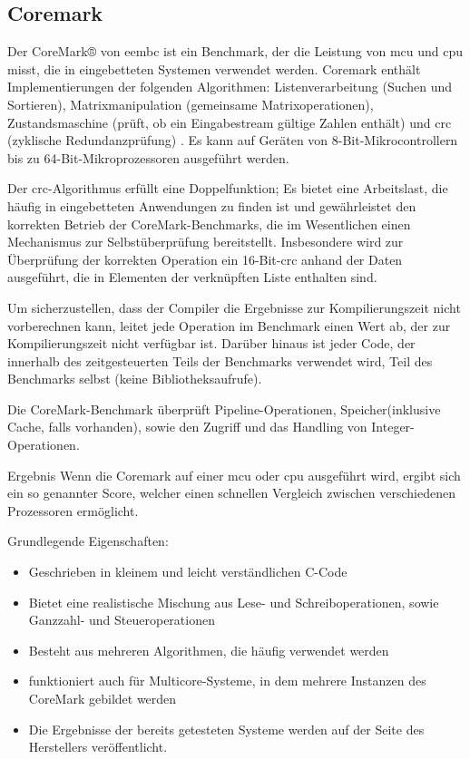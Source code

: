   \subsection{Coremark}\label{kap:coremark}
  Der CoreMark® von \ac{eembc} ist ein Benchmark, der die Leistung von \ac{mcu} und \ac{cpu} misst, die in eingebetteten Systemen verwendet werden.
   Coremark enthält Implementierungen der folgenden Algorithmen: Listenverarbeitung (Suchen und Sortieren),
    Matrixmanipulation (gemeinsame Matrixoperationen), Zustandsmaschine (prüft, ob ein Eingabestream gültige Zahlen enthält) und \ac{crc} (zyklische Redundanzprüfung) .
    Es kann auf Geräten von 8-Bit-Mikrocontrollern bis zu 64-Bit-Mikroprozessoren ausgeführt werden.

  Der \ac{crc}-Algorithmus erfüllt eine Doppelfunktion; Es bietet eine Arbeitslast, die häufig in eingebetteten Anwendungen zu finden ist
  und gewährleistet den korrekten Betrieb der CoreMark-Benchmarks, die im Wesentlichen einen Mechanismus zur Selbstüberprüfung bereitstellt.
   Insbesondere wird zur Überprüfung der korrekten Operation ein 16-Bit-\ac{crc} anhand der Daten ausgeführt, die in Elementen der verknüpften Liste enthalten sind.

  Um sicherzustellen, dass der Compiler die Ergebnisse zur Kompilierungszeit nicht vorberechnen kann, leitet jede Operation im Benchmark einen Wert ab,
  der zur Kompilierungszeit nicht verfügbar ist. Darüber hinaus ist jeder Code, der innerhalb des zeitgesteuerten Teils der Benchmarks verwendet wird,
  Teil des Benchmarks selbst (keine Bibliotheksaufrufe).

  Die CoreMark-Benchmark überprüft Pipeline-Operationen, Speicher(inklusive Cache, falls vorhanden), sowie den Zugriff und das Handling von Integer-Operationen.

  Ergebnis
  Wenn die Coremark auf einer \ac{mcu} oder \ac{cpu} ausgeführt wird, ergibt sich ein so genannter Score, welcher einen schnellen Vergleich zwischen verschiedenen Prozessoren ermöglicht.


  Grundlegende Eigenschaften:
\begin{itemize}
  \item Geschrieben in kleinem und leicht verständlichen C-Code
  \item Bietet eine realistische Mischung aus Lese- und Schreiboperationen, sowie Ganzzahl- und Steueroperationen
  \item Besteht aus mehreren Algorithmen, die häufig verwendet werden
  \item funktioniert auch für Multicore-Systeme, in dem mehrere Instanzen des CoreMark gebildet werden
  \item Die Ergebnisse der bereits getesteten Systeme werden auf der Seite des Herstellers veröffentlicht.
\end{itemize}



